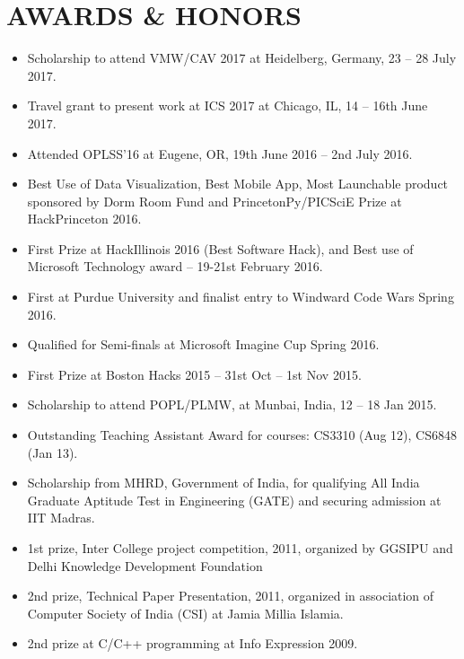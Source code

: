 \documentclass[10pt]{article}
\begin{document}
\section*{AWARDS \& HONORS}
\begin{itemize}
\itemsep-0.2em
\item Scholarship to attend VMW/CAV 2017 at Heidelberg, Germany, 23 -- 28 July 2017.
\item Travel grant to present work at ICS 2017 at Chicago, IL, 14 -- 16th June 2017. 
\item Attended OPLSS'16 at Eugene, OR, 19th June 2016 – 2nd July 2016.
\item Best Use of Data Visualization, Best Mobile App, Most Launchable product sponsored by Dorm Room Fund and PrincetonPy/PICSciE Prize at HackPrinceton 2016.
\item First Prize at HackIllinois 2016 (Best Software Hack), and 
Best use of Microsoft Technology award – 19-21st February 2016.
\item First at Purdue University and finalist entry to Windward Code Wars Spring 2016.
\item Qualified for Semi-finals at Microsoft Imagine Cup Spring 2016.
\item First Prize at Boston Hacks 2015 – 31st Oct – 1st Nov 2015.
\item Scholarship to attend POPL/PLMW, at Munbai, India, 12 -- 18 Jan 2015.
\item Outstanding Teaching Assistant Award for courses: CS3310 (Aug 12), CS6848 (Jan 13).
\item Scholarship from MHRD, Government of India, for qualifying All India Graduate
Aptitude Test in Engineering (GATE) and securing admission at IIT Madras.
\item 1st prize, Inter College project competition, 2011, organized by GGSIPU and Delhi
Knowledge Development Foundation
\item 2nd prize, Technical Paper Presentation, 2011, organized in association of Computer
Society of India (CSI) at Jamia Millia Islamia.
\item 2nd prize at C/C++ programming at Info Expression 2009.
\end{itemize}
\end{document}
